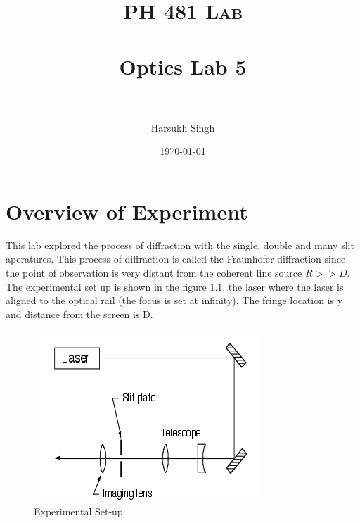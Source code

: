 \documentclass[paper=a4, fontsize=11pt]{scrartcl} %
\title{	
\normalfont \normalsize 
\textsc{PH 481 Lab} \\ [25pt] %
\horrule{2pt} \\[0.5cm] %
\huge Optics Lab 5\\ %
\horrule{2pt} \\[0.5cm] %
}
\author{Harsukh Singh} %
\date{\normalsize \today} %
\numberwithin{equation}{section} %
\numberwithin{figure}{section} %
\numberwithin{table}{section} %
\begin{document}
\maketitle %
\section{Overview of Experiment}
\FloatBarrier
This lab explored the process of diffraction with the single, double and many slit aperatures. This process of diffraction is called the Fraunhofer diffraction since the point of observation is very distant from the coherent line source $ R >> D$.  The experimental set up is shown in the figure 1.1, the laser where the laser is aligned to the optical rail (the focus is set at infinity).  The fringe location is y and distance from the screen is D.

\begin{figure}[htb]
\centering
\includegraphics[scale =0.5]{stage}
\caption{Experimental Set-up}
\end{figure}
\end{document}
